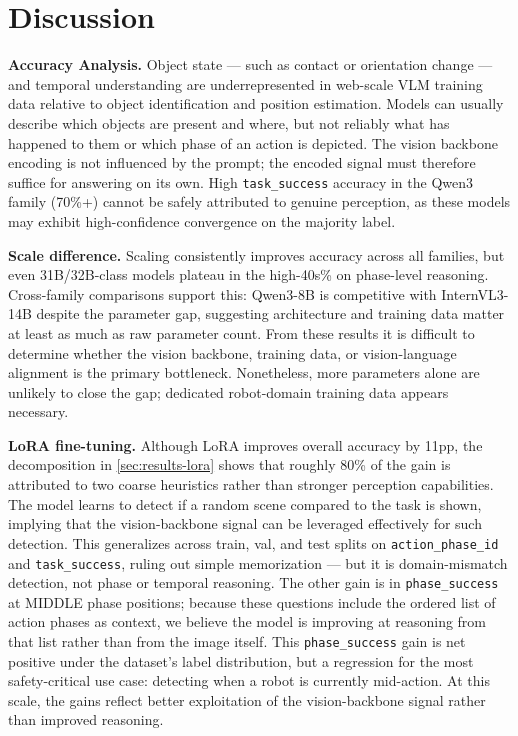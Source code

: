 \section{Discussion}
\label{sec:discussion}

\textbf{Accuracy Analysis.} Object state --- such as contact or orientation change --- and temporal understanding are underrepresented in web-scale VLM training data relative to object identification and position estimation. Models can usually describe which objects are present and where, but not reliably what has happened to them or which phase of an action is depicted. The vision backbone encoding is not influenced by the prompt; the encoded signal must therefore suffice for answering on its own.
High \texttt{task\_success} accuracy in the Qwen3 family (70\%+) cannot be safely attributed to genuine perception, as these models may exhibit high-confidence convergence on the majority label.

\textbf{Scale difference.} Scaling consistently improves accuracy across all families, but even 31B/32B-class models plateau in the high-40s\% on phase-level reasoning. Cross-family comparisons support this: Qwen3-8B is competitive with InternVL3-14B despite the parameter gap, suggesting architecture and training data matter at least as much as raw parameter count. From these results it is difficult to determine whether the vision backbone, training data, or vision-language alignment is the primary bottleneck. Nonetheless, more parameters alone are unlikely to close the gap; dedicated robot-domain training data appears necessary.

\textbf{LoRA fine-tuning.} Although LoRA improves overall accuracy by 11pp, the decomposition in \cref{sec:results-lora} shows that roughly 80\% of the gain is attributed to two coarse heuristics rather than stronger perception capabilities. The model learns to detect if a random scene compared to the task is shown, implying that the vision-backbone signal can be leveraged effectively for such detection. This generalizes across train, val, and test splits on \texttt{action\_phase\_id} and \texttt{task\_success}, ruling out simple memorization --- but it is domain-mismatch detection, not phase or temporal reasoning. The other gain is in \texttt{phase\_success} at MIDDLE phase positions; because these questions include the ordered list of action phases as context, we believe the model is improving at reasoning from that list rather than from the image itself.
This \texttt{phase\_success} gain is net positive under the dataset's label distribution, but a regression for the most safety-critical use case: detecting when a robot is currently mid-action. At this scale, the gains reflect better exploitation of the vision-backbone signal rather than improved reasoning.

